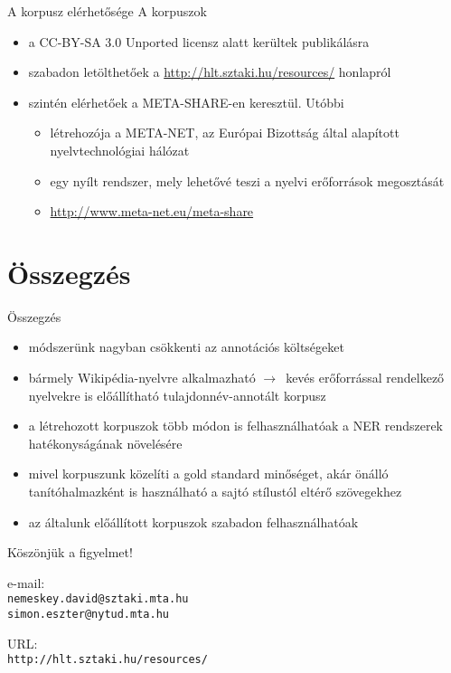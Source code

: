 \documentclass[utf8x,t]{beamer}
\newcommand{\vitem}{\item \vspace{4pt}}
\newcommand{\nyil}{$\rightarrow$\ }
\begin{document}
\begin{frame}{A korpusz elérhetősége}
\bigskip
A korpuszok
\begin{itemize}
\vitem a CC-BY-SA 3.0 Unported licensz alatt kerültek publikálásra
\vitem szabadon letölthetőek a \url{http://hlt.sztaki.hu/resources/} honlapról
\vitem szintén elérhetőek a META-SHARE-en keresztül. Utóbbi
  \begin{itemize}
  \vitem létrehozója a META-NET, az Európai Bizottság által alapított nyelvtechnológiai hálózat
  \vitem egy nyílt rendszer, mely lehetővé teszi a nyelvi erőforrások megosztását
  \vitem \url{http://www.meta-net.eu/meta-share}
  \end{itemize}
\end{itemize}

\end{frame}

\section{Összegzés}
\begin{frame}{Összegzés}
  \begin{itemize}
  \vitem módszerünk nagyban csökkenti az annotációs költségeket 
  \vitem bármely Wikipédia-nyelvre alkalmazható \nyil kevés erőforrással rendelkező nyelvekre is előállítható tulajdonnév-annotált korpusz
  \vitem a létrehozott korpuszok több módon is felhasználhatóak a NER rendszerek hatékonyságának növelésére
  \vitem mivel korpuszunk közelíti a gold standard minőséget, akár önálló tanítóhalmazként is használható a sajtó stílustól eltérő szövegekhez
  \vitem az általunk előállított korpuszok szabadon felhasználhatóak
  \end{itemize}
  \vfill
\end{frame}

\begin{frame}

\bigskip

\bigskip

{\huge Köszönjük a figyelmet!}

\bigskip
\bigskip
\bigskip

e-mail: \\ {\tt nemeskey.david@sztaki.mta.hu \\ simon.eszter@nytud.mta.hu} \\

\bigskip
\bigskip

URL: \\ {\tt http://hlt.sztaki.hu/resources/}


\end{frame}
\end{document}
